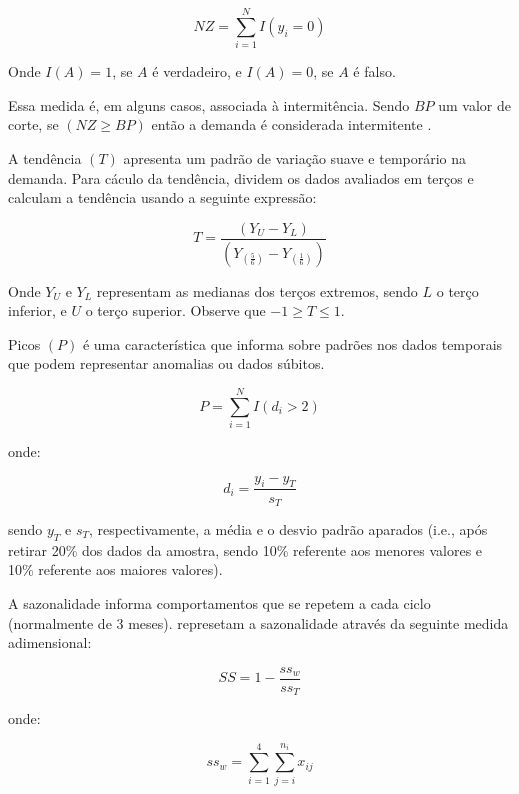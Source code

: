 \documentclass{book}
\begin{document}
\begin{equation}
NZ = \sum_{i=1}^{N}{I(y_i=0)}
\end{equation}

Onde $I(A)=1$, se $A$ é verdadeiro, e $I(A)=0$, se $A$ é falso.

Essa medida é, em alguns casos, associada à intermitência. Sendo $BP$ um valor de corte, se $(NZ\geq BP)$ então a demanda é considerada intermitente \citep{BoylanEtAl2008}.

A tendência $(T)$ apresenta um padrão de variação suave e temporário na demanda. Para cáculo da tendência, \cite{BusingerRead1999} dividem os dados avaliados em terços e calculam a tendência usando a seguinte expressão:

\begin{equation}
T = \frac{(Y_U - Y_L)}{(Y_{(\frac{5}{6})} - Y_{(\frac{1}{6})})}
\end{equation}

Onde $Y_U$ e $Y_L$ representam as medianas dos terços extremos, sendo $L$ o terço inferior, e $U$ o terço superior. Observe que $-1 \geq T \leq 1$.

Picos $(P)$ é uma característica que informa sobre padrões nos dados temporais que podem representar anomalias ou dados súbitos.

\begin{equation}
P = \sum_{i=1}^{N}{I(d_i > 2)}
\end{equation}

onde:

\begin{equation}
d_i = \frac{y_i - y_{T}}{s_{T}}
\end{equation}

sendo $y_{T}$ e $s_{T}$, respectivamente, a média e o desvio padrão aparados (i.e., após retirar 20\% dos dados da amostra, sendo 10\% referente aos menores valores e 10\% referente aos maiores valores).

A sazonalidade informa comportamentos que se repetem a cada ciclo (normalmente de 3 meses). \cite{BusingerRead1999} represetam a sazonalidade através da seguinte medida adimensional:

\begin{equation}
SS = 1 - \frac{ss_{w}}{ss_{T}}
\end{equation}

onde:

\begin{equation}
ss_{w} = \sum_{i=1}^{4}\sum_{j=i}^{n_i}{x_{ij}}
\end{equation}
\end{document}
